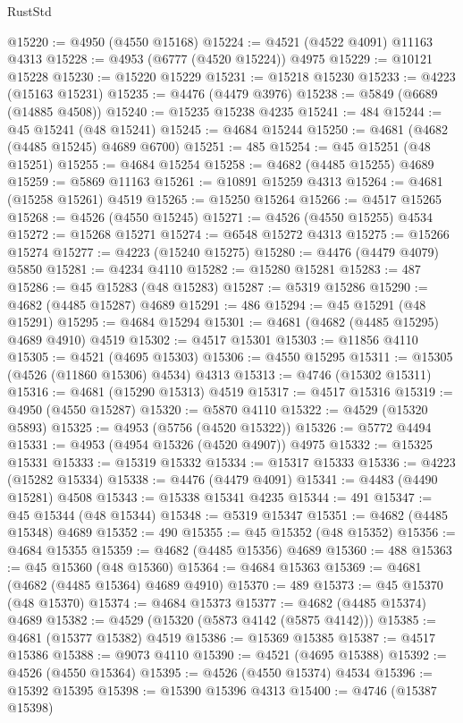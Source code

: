\begin{lexlean}{RustStd}
\begin{coremodule}
@15220 := @4950 (@4550 @15168)
@15224 := @4521 (@4522 @4091) @11163 @4313
@15228 := @4953 (@6777 (@4520 @15224)) @4975
@15229 := @10121 @15228
@15230 := @15220 @15229
@15231 := @15218 @15230
@15233 := @4223 (@15163 @15231)
@15235 := @4476 (@4479 @3976)
@15238 := @5849 (@6689 (@14885 @4508))
@15240 := @15235 @15238 @4235
@15241 := 484
@15244 := @45 @15241 (@48 @15241)
@15245 := @4684 @15244
@15250 := @4681 (@4682 (@4485 @15245) @4689 @6700)
@15251 := 485
@15254 := @45 @15251 (@48 @15251)
@15255 := @4684 @15254
@15258 := @4682 (@4485 @15255) @4689
@15259 := @5869 @11163
@15261 := @10891 @15259 @4313
@15264 := @4681 (@15258 @15261) @4519
@15265 := @15250 @15264
@15266 := @4517 @15265
@15268 := @4526 (@4550 @15245)
@15271 := @4526 (@4550 @15255) @4534
@15272 := @15268 @15271
@15274 := @6548 @15272 @4313
@15275 := @15266 @15274
@15277 := @4223 (@15240 @15275)
@15280 := @4476 (@4479 @4079) @5850
@15281 := @4234 @4110
@15282 := @15280 @15281
@15283 := 487
@15286 := @45 @15283 (@48 @15283)
@15287 := @5319 @15286
@15290 := @4682 (@4485 @15287) @4689
@15291 := 486
@15294 := @45 @15291 (@48 @15291)
@15295 := @4684 @15294
@15301 := @4681 (@4682 (@4485 @15295) @4689 @4910) @4519
@15302 := @4517 @15301
@15303 := @11856 @4110
@15305 := @4521 (@4695 @15303)
@15306 := @4550 @15295
@15311 := @15305 (@4526 (@11860 @15306) @4534) @4313
@15313 := @4746 (@15302 @15311)
@15316 := @4681 (@15290 @15313) @4519
@15317 := @4517 @15316
@15319 := @4950 (@4550 @15287)
@15320 := @5870 @4110
@15322 := @4529 (@15320 @5893)
@15325 := @4953 (@5756 (@4520 @15322))
@15326 := @5772 @4494
@15331 := @4953 (@4954 @15326 (@4520 @4907)) @4975
@15332 := @15325 @15331
@15333 := @15319 @15332
@15334 := @15317 @15333
@15336 := @4223 (@15282 @15334)
@15338 := @4476 (@4479 @4091)
@15341 := @4483 (@4490 @15281) @4508
@15343 := @15338 @15341 @4235
@15344 := 491
@15347 := @45 @15344 (@48 @15344)
@15348 := @5319 @15347
@15351 := @4682 (@4485 @15348) @4689
@15352 := 490
@15355 := @45 @15352 (@48 @15352)
@15356 := @4684 @15355
@15359 := @4682 (@4485 @15356) @4689
@15360 := 488
@15363 := @45 @15360 (@48 @15360)
@15364 := @4684 @15363
@15369 := @4681 (@4682 (@4485 @15364) @4689 @4910)
@15370 := 489
@15373 := @45 @15370 (@48 @15370)
@15374 := @4684 @15373
@15377 := @4682 (@4485 @15374) @4689
@15382 := @4529 (@15320 (@5873 @4142 (@5875 @4142)))
@15385 := @4681 (@15377 @15382) @4519
@15386 := @15369 @15385
@15387 := @4517 @15386
@15388 := @9073 @4110
@15390 := @4521 (@4695 @15388)
@15392 := @4526 (@4550 @15364)
@15395 := @4526 (@4550 @15374) @4534
@15396 := @15392 @15395
@15398 := @15390 @15396 @4313
@15400 := @4746 (@15387 @15398)

\end{coremodule}
\end{lexlean}
